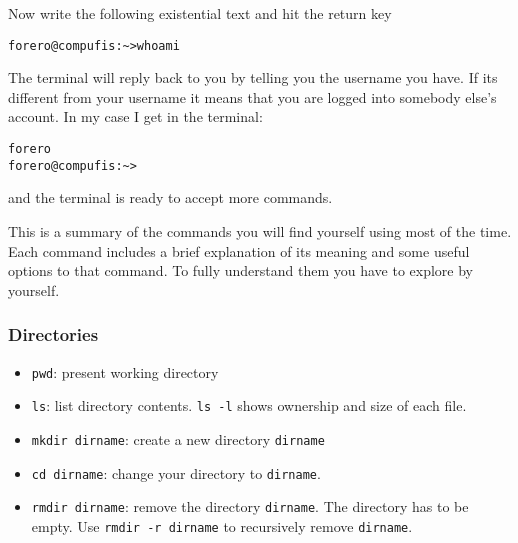 \documentclass{article}
\begin{document}
Now write the following existential text and hit the return key

\begin{verbatim}
forero@compufis:~>whoami
\end{verbatim}

The terminal will reply back to you by telling you the username you
have. If its different from your username it means that you are logged
into somebody else's account. In my case I get in the terminal: 

\begin{verbatim}
forero
forero@compufis:~>
\end{verbatim}
and the terminal is ready to accept more commands.


This is a summary of the commands you will find yourself using most of
the time. Each command includes a brief explanation of its meaning and
some useful options to that command. To fully understand them you have
to explore by yourself. 

\subsubsection*{Directories}
\begin{itemize}
\item\verb"pwd": present working directory
\item\verb"ls": list directory contents. \verb"ls -l" shows ownership and size of each file.
\item\verb"mkdir dirname": create a new directory \verb"dirname"
\item\verb"cd dirname": change your directory to \verb"dirname". 
\item\verb"rmdir dirname": remove the directory \verb"dirname". The directory has to be empty. Use \verb"rmdir -r dirname" to recursively remove \verb"dirname".
\end{itemize}
\end{document}
